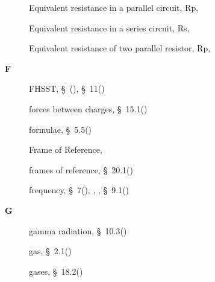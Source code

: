 \begin{multicols}{2}
{\begin{description}
	  \item[] \noindent\raggedright Equivalent resistance in a parallel circuit, Rp,  \pageref{id2487427}
	  
	  \item[] \noindent\raggedright Equivalent resistance in a series circuit, Rs,  \pageref{id2485652}
	  
	  \item[] \noindent\raggedright Equivalent resistance of two parallel resistor, Rp,  \pageref{id2487246}
	  \vspace{.3cm}
	  \item[{\large \bfseries F}]\noindent\raggedright
	  FHSST,  \S~(\pageref{m30853}),  \S~11(\pageref{m38120})
	  
	  \item[] \noindent\raggedright forces between charges,  \S~15.1(\pageref{m38780})
	  
	  \item[] \noindent\raggedright formulae,  \S~5.5(\pageref{m38689})
	  
	  \item[] \noindent\raggedright Frame of Reference,  \pageref{id2526298}
	  
	  \item[] \noindent\raggedright frames of reference,  \S~20.1(\pageref{m38787})
	  
	  \item[] \noindent\raggedright frequency,  \S~7(\pageref{m38806}),  \pageref{id2440655},  \pageref{id2445977},  \S~9.1(\pageref{m38799})
	  \vspace{.3cm}
	  \item[{\large \bfseries G}]\noindent\raggedright
	  gamma radiation,  \S~10.3(\pageref{m38779})
	  
	  \item[] \noindent\raggedright gas,  \S~2.1(\pageref{m38736})
	  
	  \item[] \noindent\raggedright gases,  \S~18.2(\pageref{m38712})
	  

\end{description}}
\end{multicols}
